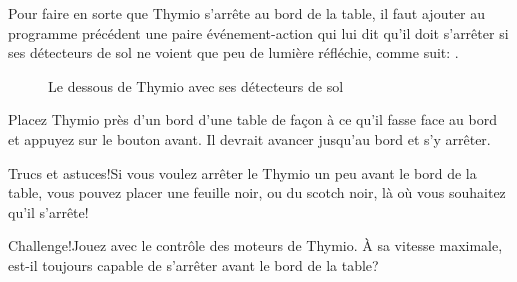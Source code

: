 Pour faire en sorte que Thymio s'arrête au bord de la table, il faut ajouter au programme précédent une paire événement-action qui lui dit qu'il doit s'arrêter si ses détecteurs de sol ne voient que peu de lumière réfléchie, comme suit: .

\begin{figure}
\begin{center}
\caption{Le dessous de Thymio avec ses détecteurs de sol}\label{fig.bottom}
\end{center}
\end{figure}

Placez Thymio près d'un bord d'une table de façon à ce qu'il fasse face au bord et appuyez sur le bouton avant. Il devrait avancer jusqu'au bord et s'y arrêter. 

\begin{bclogo}[couleur = blue!30, arrondi = 0.1, logo = \bcinfo, ombre = true]{Trucs et astuces!}Si vous voulez arrêter le Thymio un peu avant le bord de la table, vous pouvez placer une feuille noir, ou du scotch noir, là où vous souhaitez qu'il s'arrête! 
\end{bclogo}

\begin{bclogo}[couleur = pink!30, arrondi = 0.1, logo = \bccrayon, ombre = true]{Challenge!}Jouez avec le contrôle des moteurs de Thymio. À sa vitesse maximale, est-il toujours capable de s'arrêter avant le bord de la table?
\end{bclogo}
